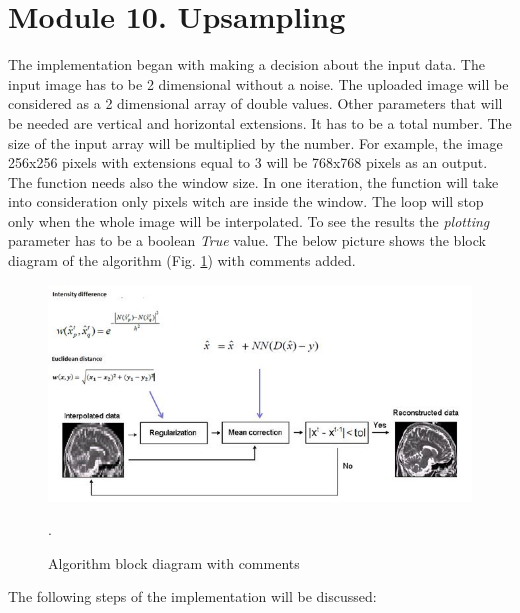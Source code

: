 \section{Module 10. Upsampling}

The implementation began with making a decision about the input data. The input image has to be 2 dimensional without a noise. The uploaded image will be considered as a 2 dimensional array of double values. Other parameters that will be needed are vertical and horizontal extensions. It has to be a total number. The size of the input array will be multiplied by the number. For example, the image 256x256 pixels with extensions equal to 3 will be 768x768 pixels as an output. The function needs also the window size. In one iteration, the function will take into consideration only pixels witch are inside the window. The loop will stop only when the whole image will be interpolated. To see the results the \textit{plotting} parameter has to be a boolean \textit{True} value. 
\newline The below picture shows the block diagram of the algorithm (Fig. \ref{fig: Module10_4}) with comments added.

\begin{figure}[H]
\centering{}\includegraphics[scale=0.7]{figures/Module_10/Module10_4}\caption{Algorithm block diagram with comments}. 
\label{fig: Module10_4}
\end{figure}

The following steps of the implementation will be discussed:

